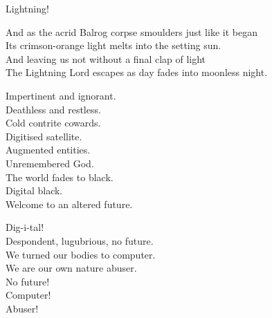 Lightning! \\





And as the acrid Balrog corpse smoulders just like it began \\
Its crimson-orange light melts into the setting sun. \\

And leaving us not without a final clap of light \\
The Lightning Lord escapes as day fades into moonless night. \\





Impertinent and ignorant. \\
Deathless and restless. \\
Cold contrite cowards. \\

Digitised satellite. \\
Augmented entities. \\
Unremembered God. \\

The world fades to black. \\
Digital black. \\
Welcome to an altered future. \\





Dig-i-tal! \\

Despondent, lugubrious, no future. \\
We turned our bodies to computer. \\
We are our own nature abuser. \\

No future! \\
Computer! \\
Abuser! \\


